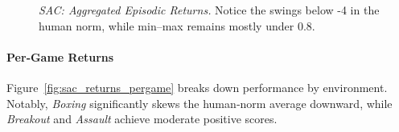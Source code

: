 \begin{figure}
	\centering
	\quad
	\caption{\emph{SAC: Aggregated Episodic Returns.} Notice the swings below -4 in the human norm, while min–max remains mostly under 0.8.}
	\label{fig:sac_returns_human_minmax}
\end{figure}

\paragraph{Per‐Game Returns}
Figure~\ref{fig:sac_returns_pergame} breaks down performance by environment. Notably, \emph{Boxing} significantly skews the human‐norm average downward, while \emph{Breakout} and \emph{Assault} achieve moderate positive scores.

